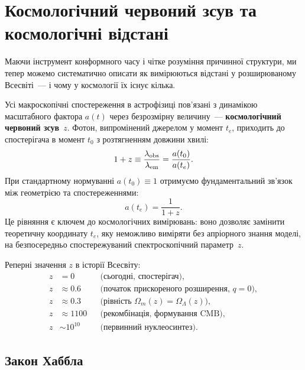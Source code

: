\section{Космологічний червоний зсув та космологічні відстані}
\label{sec:redshift_distances}

Маючи інструмент конформного часу і чітке розуміння причинної структури,
ми тепер можемо систематично описати як вимірюються відстані
у розширюваному Всесвіті~--- і чому у космології їх існує кілька.

Усі макроскопічні спостереження в астрофізиці пов'язані з динамікою
масштабного фактора $a(t)$ через безрозмірну величину~---
\textbf{космологічний червоний зсув}~$z$. Фотон, випромінений
джерелом у момент $t_e$, приходить до спостерігача в момент $t_0$
з розтягненням довжини хвилі:
\begin{equation}\label{eq:redshift}
  1 + z \equiv \frac{\lambda_{\rm obs}}{\lambda_{\rm em}}
             = \frac{a(t_0)}{a(t_e)}.
\end{equation}
При стандартному нормуванні $a(t_0) \equiv 1$ отримуємо
фундаментальний зв'я\-зок між геометрією та спостереженнями:
\begin{equation}\label{eq:a_z}
  a(t_e) = \frac{1}{1+z}.
\end{equation}
Це рівняння є ключем до космологічних вимірювань: воно дозволяє
замінити теоретичну координату $t_e$, яку неможливо виміряти без
апріорного знання моделі, на безпосередньо спостережуваний
спектроскопічний параметр~$z$.

Реперні значення $z$ в історії Всесвіту:
\begin{align*}
  z &= 0      && \text{(сьогодні, спостерігач)}, \\
  z &\approx 0.6  && \text{(початок прискореного розширення, $q=0$)}, \\
  z &\approx 0.3  && \text{(рівність $\Omega_m(z)=\Omega_\Lambda(z)$)}, \\
  z &\approx 1100 && \text{(рекомбінація, формування CMB)}, \\
  z &\sim 10^{10} && \text{(первинний нуклеосинтез)}.
\end{align*}

\subsection*{Закон Хаббла}

